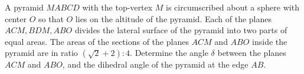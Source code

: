 A pyramid $MABCD$ with the top-vertex $M$ is circumscribed about a sphere with center $O$ so that $O$ lies on the altitude of the pyramid. Each of the planes $ACM,BDM,ABO$ divides the lateral surface of the pyramid into two parts of equal areas. The areas of the sections of the planes $ACM$ and $ABO$ inside the pyramid are in ratio $(\sqrt2+2):4$. Determine the angle $\delta$ between the planes $ACM$ and $ABO$, and the dihedral angle of the pyramid at the edge $AB$.